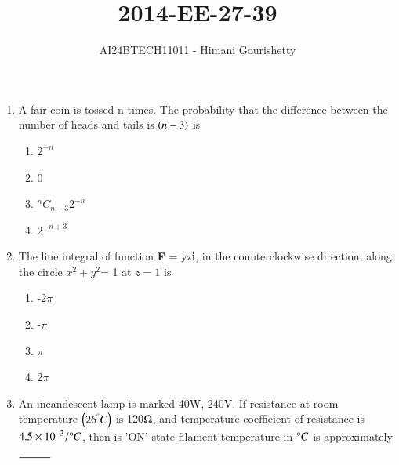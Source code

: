 \documentclass[journal,12pt,onecolumn]{IEEEtran}
\theoremstyle{remark}
\begin{document}

\vspace{3cm}

\title{2014-EE-27-39}
\author{AI24BTECH11011 - Himani Gourishetty}
\maketitle
\bigskip

\renewcommand{\thefigure}{\theenumi}
\renewcommand{\thetable}{\theenumi}
\begin{enumerate}
 \item A fair coin is tossed n times. The probability that the difference between the number of heads and tails is $\left(n-3\right)$ is
 \begin{enumerate}
     \item $2^{-n}$
\item 0
\item $^{n}C_{n-3}2^{-n}$
\item $2^{-n+3}$
 \end{enumerate}
 \item The line integral of function \textbf{F} = yz\textbf{i}, in the counterclockwise direction, along the circle $x^{2} + y^{2}$= 1 at $z= 1$ is
\begin{enumerate}
    \item -2$\pi$
    \item -$\pi$
    \item $\pi$
    \item 2$\pi$
\end{enumerate}
\item An incandescent lamp is marked 40W, 240V. If resistance at room temperature $\left(26^\degree C\right)$ is 120$\ohm$, and temperature coefficient of resistance is $4.5\times10^{-3}/\degree C$, then is 'ON' state filament temperature in $\degree C$ is approximately $\makebox[3cm][l]{\underline{\hspace{1cm}}}$


\end{enumerate}
\end{document}
